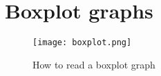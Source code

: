 \appendix
\chapter{Boxplot graphs}
\label{app:boxplot}

\begin{figure}[H]
\centering
\texttt{[image: boxplot.png]}
\caption[How to read a boxplot graph]{How to read a boxplot graph \cite{stk_boxplot}}
\label{boxlot}
\end{figure}